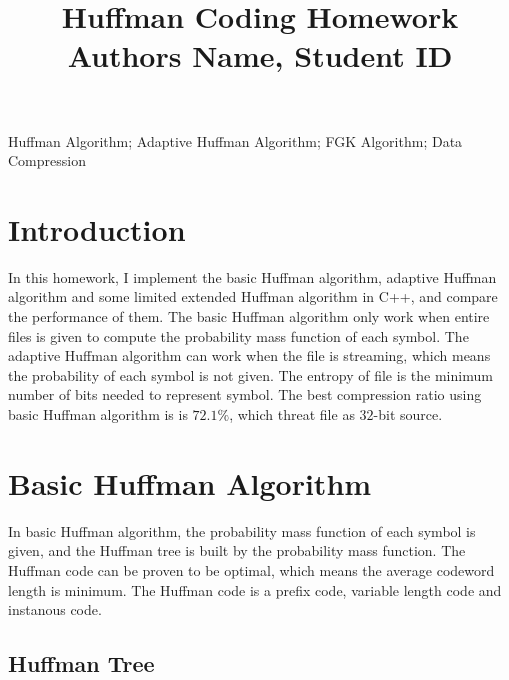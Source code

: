 \documentclass[a4paper,conference]{IEEEtran}
\begin{document}
\renewcommand\footnoterule{{\hrule height 0.5pt}\vspace{0.04in}}
\def\IEEEkeywordsname{Keywords}

\title{Huffman Coding Homework\\
\vspace{-0.1in}
{\normalsize Authors Name, Student ID}
}

\author{}

\maketitle


\vspace{0.1in}

\begin{IEEEkeywords}
Huffman Algorithm; Adaptive Huffman Algorithm; FGK Algorithm; Data Compression
\end{IEEEkeywords}

\section{Introduction}
In this homework, I implement the basic Huffman algorithm, adaptive Huffman algorithm and some limited extended Huffman algorithm in C++, and compare the performance of them. The basic Huffman algorithm only work when entire files is given to compute the probability mass function of each symbol. The adaptive Huffman algorithm can work when the file is streaming, which means the probability of each symbol is not given. The entropy of file is the minimum number of bits needed to represent symbol. The best compression ratio using basic Huffman algorithm is is $72.1\%$, which threat file as $32$-bit source.

\section{Basic Huffman Algorithm}

In basic Huffman algorithm, the probability mass function of each symbol is given, and the Huffman tree is built by the probability mass function. The Huffman code can be proven to be optimal, which means the average codeword length is minimum. The Huffman code is a prefix code, variable length code and instanous code.

\subsection{Huffman Tree}
\end{document}
